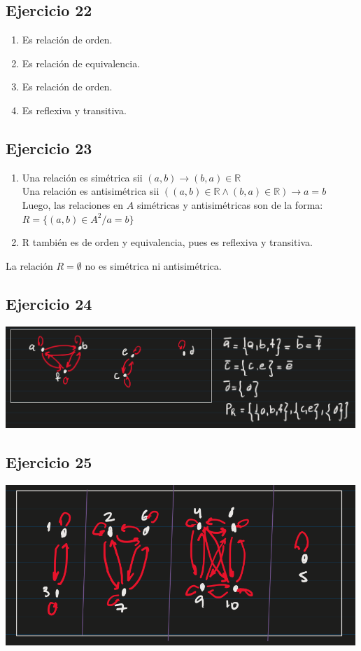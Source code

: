 \subsection{Ejercicio 22}
\begin{enumerate}[label=(\alph*)]
    \item Es relación de orden.
    \item Es relación de equivalencia.
    \item Es relación de orden.
    \item Es reflexiva y transitiva.
\end{enumerate}

\subsection{Ejercicio 23}
\begin{enumerate}[label=(\alph*)]
    \item Una relación es simétrica sii $(a,b) \rightarrow (b,a) \in \mathbb{R}$ \\
        Una relación es antisimétrica sii $((a,b) \in \mathbb{R} \wedge (b,a) \in \mathbb{R}) \rightarrow a = b$ \\
        Luego, las relaciones en $A$ simétricas y antisimétricas son de la forma: \\
        $R = \{ (a,b) \in A^2 / a = b \}$
    \item R también es de orden y equivalencia, pues es reflexiva y transitiva.
\end{enumerate}

La relación $R = \emptyset$ no es simétrica ni antisimétrica.

\subsection{Ejercicio 24}
\includegraphics[width=500px]{1.24}

\subsection{Ejercicio 25}
\includegraphics[width=500px]{1.25}

